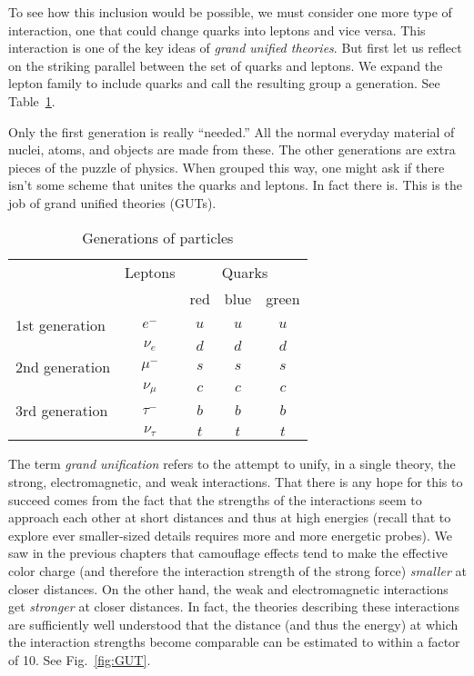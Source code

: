 To see how this inclusion would be possible, we must consider one more
type of interaction, one that could change quarks into leptons and
vice versa.  This interaction is one of the key ideas of {\em grand
unified theories}.  But first let us reflect on the striking parallel
between the set of quarks and leptons.  We expand the lepton family to
include quarks and call the resulting group a generation.  See
Table~\ref{table:particle_generations}.

Only the first generation is really ``needed.''  All the normal
everyday material of nuclei, atoms, and objects are made from these.
The other generations are extra pieces of the puzzle of physics.  When
grouped this way, one might ask if there isn't some scheme that unites
the quarks and leptons.  In fact there is.  This is the job of grand
unified theories (GUTs).

\begin{table}[tbp]
\caption{Generations of particles}
\label{table:particle_generations}
\begin{center}
\begin{tabular}[tbp]{lcccc}
 & Leptons & \multicolumn{3}{c}{Quarks} \\
 & & red & blue & green \\
\hline\hline
1st generation & $e^-$ & $u$ & $u$ & $u$ \\
               & $\nu_e$ & $d$ & $d$ & $d$ \\[0.5ex]
2nd generation & $\mu^-$ & $s$ & $s$ & $s$ \\
               & $\nu_\mu$ & $c$ & $c$ & $c$ \\[0.5ex]
3rd generation & $\tau^-$ & $b$ & $b$ & $b$ \\
               & $\nu_\tau$ & $t$ & $t$ & $t$ \\[0.5ex]
\hline
\end{tabular}
\end{center}
\end{table}

The term {\em grand unification} refers to the attempt to unify, in a
single theory, the strong, electromagnetic, and weak interactions.
That there is any hope for this to succeed comes from the fact that
the strengths of the interactions seem to approach each other at short
distances and thus at high energies (recall that to explore ever
smaller-sized details requires more and more energetic probes).  We
saw in the previous chapters that camouflage effects tend to make the
effective color charge (and therefore the interaction strength of the
strong force) {\em smaller} at closer distances.  On the other hand, the
weak and electromagnetic interactions get {\em stronger} at closer
distances.  In fact, the theories describing these interactions are
sufficiently well understood that the distance (and thus the energy)
at which the interaction strengths become comparable can be estimated
to within a factor of 10.  See Fig.~\ref{fig:GUT}.

